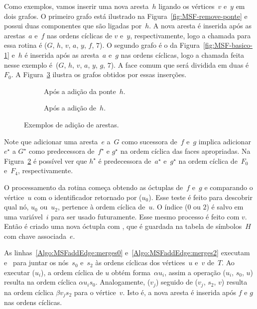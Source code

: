 Como exemplos, vamos inserir uma nova aresta~$h$ ligando os vértices~$v$ e~$y$ em dois grafos.
O primeiro grafo está ilustrado na Figura~\ref{fig:MSF-remove-ponte} e possui duas componentes que são ligadas por~$h$. 
A nova aresta é inserida após as arestas~$a$ e~$f$ nas ordens cíclicas de $v$ e~$y$, respectivamente, logo a chamada para essa rotina é \MSFaddEdge($G$, $h$, $v$, $a$, $y$, $f$, $7$).
O segundo grafo é o da Figura~\ref{fig:MSF-basico-1} e~$h$ é inserida após as aresta~$a$ e~$g$ nas ordens cíclicas, logo a chamada feita nesse exemplo é~\MSFaddEdge($G$, $h$, $v$, $a$, $y$, $g$, $7$).
A face comum que será dividida em duas é~$F_0$.
A Figura~\ref{fig:antes-depois-adiciona} ilustra os grafos obtidos por essas inserções.


\begin{figure}[htb]
\begin{subfigure}{0.45\textwidth}
\scalebox{1}{

}
\caption{Após a adição da ponte~$h$.}
\label{fig:MSF-adiciona-ponte}
\end{subfigure}
\begin{subfigure}{0.45\textwidth}
\scalebox{1}{

}
\caption{Após a adição de~$h$.}
\label{fig:MSF-adiciona-nao-ponte}
\end{subfigure}
\caption{Exemplos de adição de arestas.}
\label{fig:antes-depois-adiciona}
\end{figure}

Note que adicionar uma aresta~$e$ a~$G$ como sucessora de~$f$ e~$g$ implica adicionar $e^\star$ a $G^\star$ como predecessora de~$f^\star$ e $g^\star$ na ordem cíclica das faces apropriadas.  
Na Figura~\ref{fig:MSF-adiciona-nao-ponte} é possível ver que $h^\star$ é predecessora de~$a^\star$ e~$g^\star$ na ordem cíclica de~$F_0$ e~$F_4$, respectivamente.


O processamento da rotina \MSFaddEdge{} começa obtendo as óctuplas de~$f$ e~$g$ e comparando o vértice~$u$ com o identificador retornado por \LCOFindNode($u_{0}$).
Esse teste é feito para descobrir qual nó, $u_0$ ou~$u_2$, pertence à ordem cíclica de~$u$.
O índice ($0$ ou $2$) é salvo em uma variável~$i$ para ser usado futuramente.
Esse mesmo processo é feito com $v$.
Então é criado uma nova óctupla com \LCOMakeOcto{}, que é guardada na tabela de símbolos~$H$ com chave associada~$e$.



As linhas~\ref{Algo:MSFaddEdge:merges0} e~\ref{Algo:MSFaddEdge:merges2} executam \LCOCycle{} e~\LCOMerge{} para juntar os nós~$s_0$ e~$s_2$ às ordens cíclicas dos vértices~$u$ e~$v$ de~$\hat T$.  
Ao executar \LCOCycle($u_i$), a ordem cíclica de $u$ obtém forma~$\alpha u_i$, assim a operação \LCOMerge($u_i$, $s_0$, $u$) resulta na ordem cíclica $\alpha u_is_0$.
Analogamente, \LCOCycle($v_j$) seguido de \LCOMerge($v_j$, $s_2$, $v$) resulta na ordem cíclica $\beta v_j s_2$ para o vértice~$v$.
Isto é, a nova aresta é inserida após $f$ e $g$ nas ordens cíclicas.

